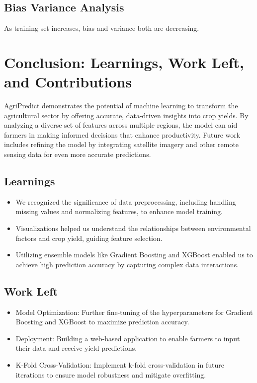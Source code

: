 \documentclass[10pt,twocolumn,letterpaper]{article}
\begin{document}
\subsection{Bias Variance Analysis}
As training set increases, bias and variance both are decreasing.


    
\section{Conclusion: Learnings, Work Left, and Contributions}
AgriPredict demonstrates the potential of machine learning to transform the agricultural sector by offering accurate, data-driven insights into crop yields. By analyzing a diverse set of features across multiple regions, the model can aid farmers in making informed decisions that enhance productivity. Future work includes refining the model by integrating satellite imagery and other remote sensing data for even more accurate predictions.
\subsection{Learnings}
\begin{itemize}[itemsep=-0.5em]
    \item We recognized the significance of data preprocessing, including handling missing values and normalizing features, to enhance model training.
    \item Visualizations helped us understand the relationships between environmental factors and crop yield, guiding feature selection.
    \item Utilizing ensemble models like Gradient Boosting and XGBoost enabled us to achieve high prediction accuracy by capturing complex data interactions.
\end{itemize}
\vspace{-10 pt}
\subsection{Work Left}
\begin{itemize}[itemsep=-0.5em]
    \item Model Optimization: Further fine-tuning of the hyperparameters for Gradient Boosting and XGBoost to maximize prediction accuracy.
    \item Deployment: Building a web-based application to enable farmers to input their data and receive yield predictions.
    \item K-Fold Cross-Validation: Implement k-fold cross-validation in future iterations to ensure model robustness and mitigate overfitting.
\end{itemize}
\vspace{-15 pt}
\end{document}
